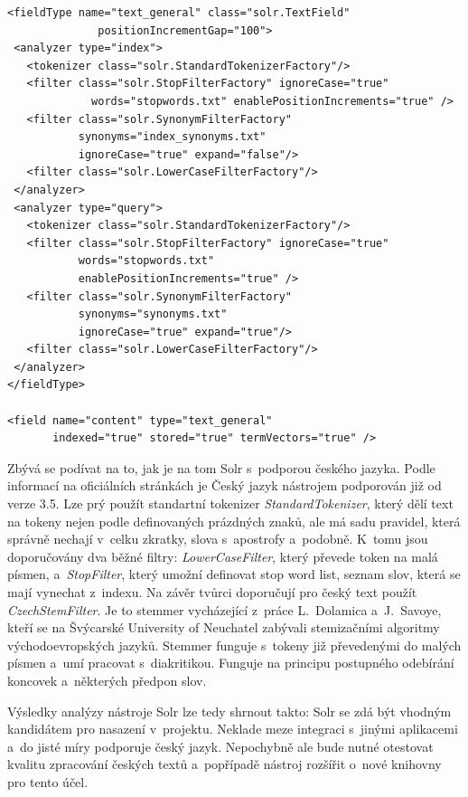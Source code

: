 \begin{verbatim}
<fieldType name="text_general" class="solr.TextField" 
			  positionIncrementGap="100">
 <analyzer type="index">
   <tokenizer class="solr.StandardTokenizerFactory"/>
   <filter class="solr.StopFilterFactory" ignoreCase="true" 
 		     words="stopwords.txt" enablePositionIncrements="true" />
   <filter class="solr.SynonymFilterFactory" 
           synonyms="index_synonyms.txt" 
           ignoreCase="true" expand="false"/>
   <filter class="solr.LowerCaseFilterFactory"/>
 </analyzer>
 <analyzer type="query">
   <tokenizer class="solr.StandardTokenizerFactory"/>
   <filter class="solr.StopFilterFactory" ignoreCase="true" 
           words="stopwords.txt" 
           enablePositionIncrements="true" />
   <filter class="solr.SynonymFilterFactory" 
           synonyms="synonyms.txt"
           ignoreCase="true" expand="true"/>
   <filter class="solr.LowerCaseFilterFactory"/>
 </analyzer>
</fieldType>

<field name="content" type="text_general" 
       indexed="true" stored="true" termVectors="true" />
\end{verbatim}

Zbývá se podívat na to, jak je na tom Solr s~podporou českého jazyka. Podle informací na oficiálních stránkách\cite{sorl:wiki} je Český jazyk nástrojem podporován již od verze 3.5. Lze prý použít standartní tokenizer \emph{StandardTokenizer}, který dělí text na tokeny nejen podle definovaných prázdných znaků, ale má sadu pravidel, která správně nechají v~celku zkratky, slova s~apostrofy a~podobně. K~tomu jsou doporučovány dva běžné filtry: \emph{LowerCaseFilter}, který převede token na malá písmen, a~\emph{StopFilter}, který umožní definovat stop word list, seznam slov, která se mají vynechat z~indexu. Na závěr tvůrci doporučují pro český text použít \emph{CzechStemFilter}. Je to stemmer vycházející z~práce L.~Dolamica a~J.~Savoye, kteří se na Švýcarské University of Neuchatel zabývali stemizačními algoritmy východoevropských jazyků. Stemmer funguje s~tokeny již převedenými do malých písmen a~umí pracovat s~diakritikou. Funguje na principu postupného odebírání koncovek a~některých předpon slov.

Výsledky analýzy nástroje Solr lze tedy shrnout takto: Solr se zdá být vhodným kandidátem pro nasazení v~projektu. Neklade meze integraci s~jinými aplikacemi a~do jisté míry podporuje český jazyk. Nepochybně ale bude nutné otestovat kvalitu zpracování českých textů a~popřípadě nástroj rozšířit o~nové knihovny pro tento účel.

